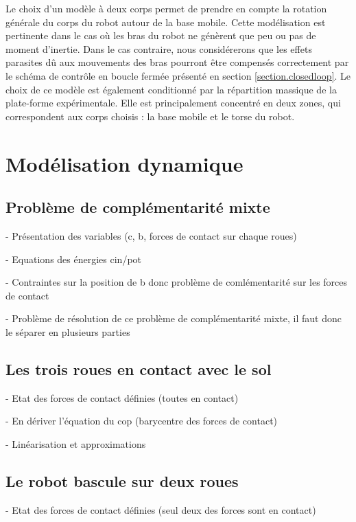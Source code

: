 	Le choix d'un modèle à deux corps permet de prendre en compte la rotation générale du corps du robot autour de la base mobile.
	Cette modélisation est pertinente dans le cas où les bras du robot ne génèrent que peu ou pas de moment d'inertie.
	Dans le cas contraire, nous considérerons que les effets parasites dû aux mouvements des bras pourront être compensés correctement par le schéma de contrôle en boucle fermée présenté en section \ref{section.closedloop}.
	Le choix de ce modèle est également conditionné par la répartition massique de la plate-forme expérimentale. 
	Elle est principalement concentré en deux zones, qui correspondent aux corps choisis : la base mobile et le torse du robot.
	
	
	\section{Modélisation dynamique}

		\subsection{Problème de complémentarité mixte}
		
			- Présentation des variables (c, b, forces de contact sur chaque roues)
		
			- Equations des énergies cin/pot

			- Contraintes sur la position de b donc problème de comlémentarité sur les forces de contact

			- Problème de résolution de ce problème de complémentarité mixte, il faut donc le séparer en plusieurs parties
		
		\subsection{Les trois roues en contact avec le sol}

			- Etat des forces de contact définies (toutes en contact)

			- En dériver l'équation du cop (barycentre des forces de contact)

			- Linéarisation et approximations
		
		\subsection{Le robot bascule sur deux roues}

			- Etat des forces de contact définies (seul deux des forces sont en contact)

